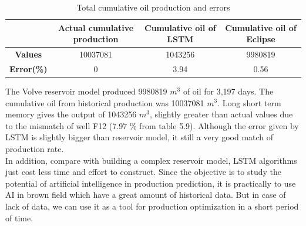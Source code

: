 \documentclass[12pt,a4paper]{report}
\begin{document}
\begin{table}[H]
\caption{Total cumulative oil production and errors}
\centering
\begin{adjustbox}{width=1\textwidth}
\small
\begin{tabular}{|c|c|c|c|}
\hline
\textbf{}       & \textbf{Actual cumulative production} & \textbf{Cumulative oil of LSTM} & \textbf{Cumulative oil of Eclipse} \\ \hline
\textbf{Values} & 10037081                              & 1043256                         & 9980819                            \\ \hline
\textbf{Error(\%)}  & 0                                  & 3.94                          & 0.56                             \\ \hline
\end{tabular}
\end{adjustbox}
\end{table}
The Volve reservoir model produced 9980819 $m^{3}$ of oil for 3,197 days. The cumulative oil from historical production was 10037081 $m^{3}$. Long short term memory gives the output of 1043256 $m^{3}$, slightly greater than actual values due to the mismatch of well F12 (7.97
\% from table 5.9). Although the error given by LSTM is slightly bigger than reservoir model, it still a very good match of production rate.\\
In addition, compare with building a complex reservoir model, LSTM algorithms just cost less time and effort to construct. Since the objective is to study the potential of artificial intelligence in production prediction, it is practically to use AI in brown field which have a great amount of historical data. But in case of lack of data, we can use it as a tool for production optimization in a short period of time.
\end{document}
